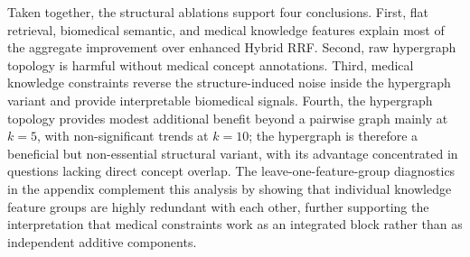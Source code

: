 Taken together, the structural ablations support four conclusions. First, flat retrieval, biomedical semantic, and medical knowledge features explain most of the aggregate improvement over enhanced Hybrid RRF. Second, raw hypergraph topology is harmful without medical concept annotations. Third, medical knowledge constraints reverse the structure-induced noise inside the hypergraph variant and provide interpretable biomedical signals. Fourth, the hypergraph topology provides modest additional benefit beyond a pairwise graph mainly at $k{=}5$, with non-significant trends at $k{=}10$; the hypergraph is therefore a beneficial but non-essential structural variant, with its advantage concentrated in questions lacking direct concept overlap. The leave-one-feature-group diagnostics in the appendix complement this analysis by showing that individual knowledge feature groups are highly redundant with each other, further supporting the interpretation that medical constraints work as an integrated block rather than as independent additive components.
